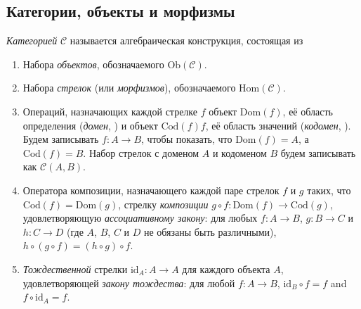 \subsection{Категории, объекты и морфизмы}
\begin{definition}
  \emph{Категорией} $\mathcal{C}$ называется алгебраическая конструкция, состоящая из
  \begin{enumerate}
    \item Набора \emph{объектов}, обозначаемого $\mathrm{Ob}(\mathcal{C})$.
    \item Набора \emph{стрелок} (или \emph{морфизмов}), обозначаемого $\mathrm{Hom}(\mathcal{C})$.
    \item Операций, назначающих каждой стрелке $f$ объект $\mathrm{Dom}(f)$, её область определения (\emph{домен}, ) и объект $\mathrm{Cod}(f)f$, её область значений (\emph{кодомен}, ). Будем записывать $f : A \to B$, чтобы показать, что  $\mathrm{Dom}(f) = A$, а $\mathrm{Cod}(f) = B$. Набор стрелок с доменом $A$ и кодоменом $B$ будем записывать как $\mathcal{C}(A, B)$.
    \item Оператора композиции, назначающего каждой паре стрелок $f$ и $g$ таких, что $\mathrm{Cod}(f) = \mathrm{Dom}(g)$, стрелку \emph{композиции} $g \circ f : \mathrm{Dom}(f) \to \mathrm{Cod}(g)$, удовлетворяющую \emph{ассоциативному закону}: для любых $f : A \to B$, $g : B \to C$ и $h : C \to D$ (где $A$, $B$, $C$ и $D$ не обязаны быть различными), $h \circ (g \circ f) = (h \circ g) \circ f$.
    \item \emph{Тождественной} стрелки $\mathrm{id}_A : A \to A$ для каждого объекта $A$, удовлетворяющей \emph{закону тождества}: для любой $f : A \to B$, $\mathrm{id}_B \circ f = f$ and $f \circ \mathrm{id}_A = f$.
  \end{enumerate}
\end{definition}

